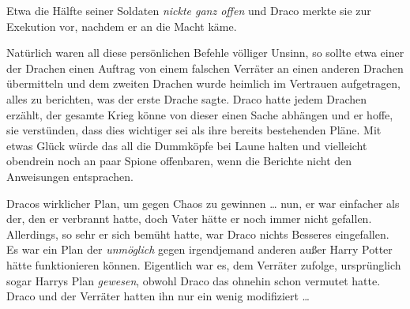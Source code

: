 Etwa die Hälfte seiner Soldaten \emph{nickte ganz offen} und Draco merkte sie zur Exekution vor, nachdem er an die Macht käme.

Natürlich waren all diese persönlichen Befehle völliger Unsinn, so sollte etwa einer der Drachen einen Auftrag von einem falschen Verräter an einen anderen Drachen übermitteln und dem zweiten Drachen wurde heimlich im Vertrauen aufgetragen, alles zu berichten, was der erste Drache sagte. Draco hatte jedem Drachen erzählt, der gesamte Krieg könne von dieser einen Sache abhängen und er hoffe, sie verstünden, dass dies wichtiger sei als ihre bereits bestehenden Pläne. Mit etwas Glück würde das all die Dummköpfe bei Laune halten und vielleicht obendrein noch an paar Spione offenbaren, wenn die Berichte nicht den Anweisungen entsprachen.

Dracos wirklicher Plan, um gegen Chaos zu gewinnen … nun, er war einfacher als der, den er verbrannt hatte, doch Vater hätte er noch immer nicht gefallen. Allerdings, so sehr er sich bemüht hatte, war Draco nichts Besseres eingefallen. Es war ein Plan der \emph{unmöglich} gegen irgendjemand anderen außer Harry Potter hätte funktionieren können. Eigentlich war es, dem Verräter zufolge, ursprünglich sogar Harrys Plan \emph{gewesen}, obwohl Draco das ohnehin schon vermutet hatte. Draco und der Verräter hatten ihn nur ein wenig modifiziert …

\later

